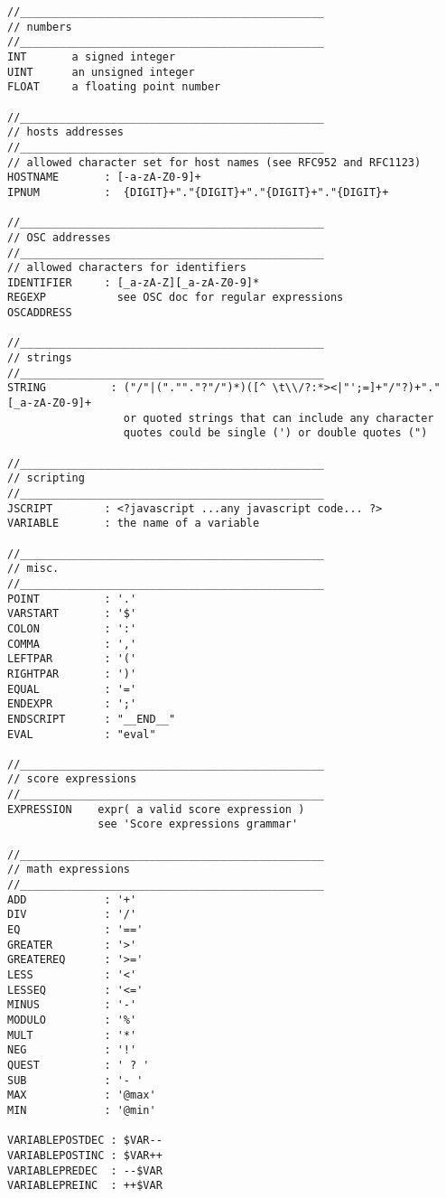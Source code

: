 
\label{lex}

\begin{verbatim}
//_______________________________________________
// numbers
//_______________________________________________
INT       a signed integer
UINT      an unsigned integer
FLOAT     a floating point number

//_______________________________________________
// hosts addresses
//_______________________________________________
// allowed character set for host names (see RFC952 and RFC1123)
HOSTNAME       : [-a-zA-Z0-9]+ 
IPNUM          :  {DIGIT}+"."{DIGIT}+"."{DIGIT}+"."{DIGIT}+

//_______________________________________________
// OSC addresses
//_______________________________________________
// allowed characters for identifiers
IDENTIFIER     : [_a-zA-Z][_a-zA-Z0-9]*
REGEXP           see OSC doc for regular expressions
OSCADDRESS

//_______________________________________________
// strings
//_______________________________________________
STRING          : ("/"|(".""."?"/")*)([^ \t\\/?:*><|"';=]+"/"?)+"."[_a-zA-Z0-9]+
                  or quoted strings that can include any character
                  quotes could be single (') or double quotes (")

//_______________________________________________
// scripting
//_______________________________________________
JSCRIPT        : <?javascript ...any javascript code... ?>
VARIABLE       : the name of a variable

//_______________________________________________
// misc.
//_______________________________________________
POINT          : '.'
VARSTART       : '$'
COLON          : ':'
COMMA          : ','
LEFTPAR        : '('
RIGHTPAR       : ')'
EQUAL          : '='
ENDEXPR        : ';'
ENDSCRIPT      : "__END__"
EVAL           : "eval"

//_______________________________________________
// score expressions
//_______________________________________________
EXPRESSION    expr( a valid score expression )
              see 'Score expressions grammar'

//_______________________________________________
// math expressions
//_______________________________________________
ADD            : '+'
DIV            : '/'
EQ             : '=='
GREATER        : '>'
GREATEREQ      : '>='
LESS           : '<'
LESSEQ         : '<='
MINUS          : '-'
MODULO         : '%'
MULT           : '*'
NEG            : '!'
QUEST          : ' ? '
SUB            : '- '
MAX            : '@max' 
MIN            : '@min'

VARIABLEPOSTDEC : $VAR--
VARIABLEPOSTINC : $VAR++
VARIABLEPREDEC  : --$VAR
VARIABLEPREINC  : ++$VAR

\end{verbatim}

